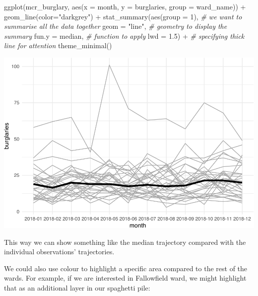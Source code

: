 \documentclass[
]{book}
\newenvironment{Shaded}{\begin{snugshade}}{\end{snugshade}}
\newcommand{\AttributeTok}[1]{\textcolor[rgb]{0.77,0.63,0.00}{#1}}
\newcommand{\CommentTok}[1]{\textcolor[rgb]{0.56,0.35,0.01}{\textit{#1}}}
\newcommand{\DecValTok}[1]{\textcolor[rgb]{0.00,0.00,0.81}{#1}}
\newcommand{\FloatTok}[1]{\textcolor[rgb]{0.00,0.00,0.81}{#1}}
\newcommand{\FunctionTok}[1]{\textcolor[rgb]{0.00,0.00,0.00}{#1}}
\newcommand{\NormalTok}[1]{#1}
\newcommand{\SpecialCharTok}[1]{\textcolor[rgb]{0.00,0.00,0.00}{#1}}
\newcommand{\StringTok}[1]{\textcolor[rgb]{0.31,0.60,0.02}{#1}}
\begin{document}
\begin{Shaded}
\begin{Highlighting}[]
\FunctionTok{ggplot}\NormalTok{(mcr\_burglary, }
       \FunctionTok{aes}\NormalTok{(}\AttributeTok{x =}\NormalTok{ month, }
           \AttributeTok{y =}\NormalTok{ burglaries, }
           \AttributeTok{group =}\NormalTok{ ward\_name)) }\SpecialCharTok{+} 
  \FunctionTok{geom\_line}\NormalTok{(}\AttributeTok{color=}\StringTok{"darkgrey"}\NormalTok{) }\SpecialCharTok{+} 
  \FunctionTok{stat\_summary}\NormalTok{(}\FunctionTok{aes}\NormalTok{(}\AttributeTok{group =} \DecValTok{1}\NormalTok{), }\CommentTok{\# we want to summarise all the data together}
               \AttributeTok{geom =} \StringTok{"line"}\NormalTok{,  }\CommentTok{\# geometry to display the summary }
               \AttributeTok{fun.y =}\NormalTok{ median, }\CommentTok{\# function to apply}
              \AttributeTok{lwd =} \FloatTok{1.5}\NormalTok{) }\SpecialCharTok{+}   \CommentTok{\# specifying thick line for attention}
  \FunctionTok{theme\_minimal}\NormalTok{()}
\end{Highlighting}
\end{Shaded}

\includegraphics{crime_mapping_files/figure-latex/unnamed-chunk-182-1.pdf}

This way we can show something like the median trajectory compared with the individual observations' trajectories.

We could also use colour to highlight a specific area compared to the rest of the wards. For example, if we are interested in Fallowfield ward, we might highlight that as an additional layer in our spaghetti pile:
\end{document}
